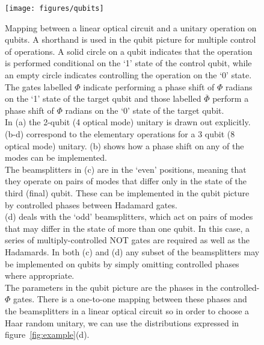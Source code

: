 \begin{figure}[p]
  \texttt{[image: figures/qubits]}
  \caption[Mapping between a linear optical circuit and a unitary operation on
    qubits]
    {Mapping between a linear optical circuit and a unitary operation on
    qubits. A shorthand is used in the qubit picture for multiple control of
    operations. A solid circle on a qubit indicates that the operation is
    performed conditional on the `1' state of the control qubit, while an empty
    circle indicates controlling the operation on the `0' state. The gates
    labelled \(\Phi\) indicate performing a phase shift of \(\Phi\) radians on
    the `1' state of the target qubit and those labelled \(\overline{\Phi}\)
    perform a phase shift of \(\Phi\) radians on the `0' state of the target
    qubit. \\
    In (a) the 2-qubit (4 optical mode) unitary is drawn out explicitly.
    (b-d) correspond to the elementary operations for a 3 qubit (8 optical mode)
    unitary. (b) shows how a phase shift on any of the modes can be
    implemented. \\
    The beamsplitters in (c) are in the `even' positions, meaning that they
    operate on pairs of modes that differ only in the state of the third (final)
    qubit. These can be implemented in the qubit picture by controlled phases
    between Hadamard gates. \\
    (d) deals with the `odd' beamsplitters, which act on
    pairs of modes that may differ in the state of more than one qubit. In this
    case, a series of multiply-controlled NOT gates are required as well as the
    Hadamards. In both (c) and (d) any subset of the beamsplitters may be
    implemented on qubits by simply omitting controlled phases where
    appropriate. \\
    The parameters in the qubit picture are the phases in the
    controlled-\(\Phi\)
    gates. There is a one-to-one mapping between these phases and the
    beamsplitters in a linear optical circuit so in order to
    choose a Haar random unitary, we can use the distributions expressed in
    figure~\ref{fig:example}(d).}
  \label{fig:qubits}
\end{figure}
  
